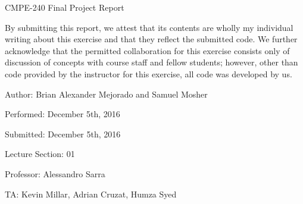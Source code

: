 
\newlength\origparskip
\newlength\origparindent

\setlength{\origparskip}{\parskip}
\setlength{\origparindent}{\parindent}

\setlength\parskip{\baselineskip}
\setlength\parindent{0 in}



CMPE-240 Final Project Report

By submitting this report, we attest that its contents are wholly my individual writing about this exercise and that they reflect the submitted code.
We further acknowledge that the permitted collaboration for this exercise consists only of discussion of concepts with course staff and fellow students; however, other than code provided by the instructor for this exercise, all code was developed by us.

Author: Brian Alexander Mejorado and Samuel Mosher

Performed: December 5th, 2016

Submitted: December 5th, 2016

Lecture Section: 01

Professor: Alessandro Sarra

TA: Kevin Millar, Adrian Cruzat, Humza Syed



\setlength\parskip{\origparskip}
\setlength\parindent{\origparindent}

\break
